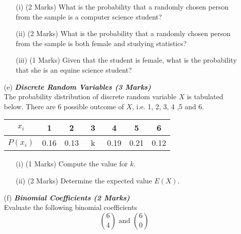 \documentclass[]{article}
\begin{document}
\begin{itemize}
\begin{itemize}
\item[(i)] (2 Marks) What is the probability that a randomly chosen person from the sample is a
computer science student?
\item[(ii)] (2 Marks) What is the probability that a randomly chosen person from the sample is both female and studying statistics?
\item[(iii)] (1 Marks) Given that the student is female, what is the probability that she is an
equine science student?
\end{itemize}
\item[(e)] \textbf{\textit{Discrete Random Variables (3 Marks)}}\\The probability distribution of discrete random variable $X$ is tabulated below. There are 6 possible outcome of $X$, i.e. 1, 2, 3, 4 ,5 and 6.
\begin{center}
\begin{tabular}{|c||c|c|c|c|c|c|}
\hline
$x_i$  & 1 & 2 & 3 & 4 & 5 & 6 \\\hline
$P(x_i)$ & 0.16 & 0.13 & \mbox{   k   } & 0.19 & 0.21 & 0.12\\
\hline
\end{tabular}
\end{center}

\begin{itemize}
\item[(i)] (1 Marks) Compute the value for $k$.
\item[(ii)] (2 Marks) Determine the expected value $E(X)$.
\end{itemize}

\item[(f)] \textbf{\textit{Binomial Coefficients (2 Marks)}}\\ Evaluate the following binomial coefficients
\[  { 6 \choose 4}   \mbox{  and }  { 6 \choose 0}\] 
\end{itemize}
\end{document}
